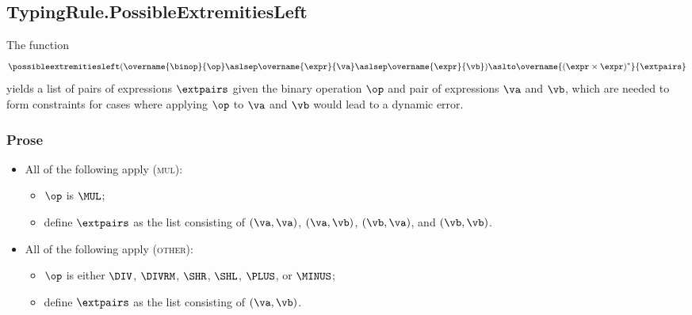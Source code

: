 \begin{mathpar}
\end{mathpar}

\subsection{TypingRule.PossibleExtremitiesLeft\label{sec:TypingRule.PossibleExtremitiesLeft}}
\hypertarget{def-possibleextremitiesleft}{}
The function
\[
\possibleextremitiesleft(
  \overname{\binop}{\op} \aslsep
  \overname{\expr}{\va} \aslsep \overname{\expr}{\vb}
) \aslto \overname{(\expr\times\expr)^*}{\extpairs}
\]
yields a list of pairs of expressions $\extpairs$ given the binary operation $\op$
and pair of expressions $\va$ and $\vb$, which are needed to form constraints
for cases where applying $\op$ to $\va$ and $\vb$ would lead to a dynamic error.

\subsubsection{Prose}
\begin{itemize}
  \item All of the following apply (\textsc{mul}):
  \begin{itemize}
    \item $\op$ is $\MUL$;
    \item define $\extpairs$ as the list consisting of $(\va, \va)$, $(\va, \vb)$, $(\vb, \va)$, and $(\vb, \vb)$.
  \end{itemize}

  \item All of the following apply (\textsc{other}):
  \begin{itemize}
    \item $\op$ is either $\DIV$, $\DIVRM$, $\SHR$, $\SHL$, $\PLUS$, or $\MINUS$;
    \item define $\extpairs$ as the list consisting of $(\va, \vb)$.
  \end{itemize}
\end{itemize}


